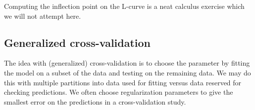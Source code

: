 Computing the inflection point on the L-curve is a neat calculus
exercise which we will not attempt here.

\subsection{Generalized cross-validation}

The idea with (generalized) cross-validation is to choose the parameter
by fitting the model on a subset of the data and testing on the remaining
data.  We may do this with multiple partitions into data used for fitting
versus data reserved for checking predictions.
We often choose regularization parameters to give the smallest error on
the predictions in a cross-validation study.
